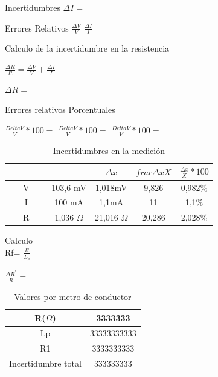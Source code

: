 \documentclass[12pt, letterpaper]{article}
\begin{document}
\item  Incertidumbres\singlespacing
$\Delta I=$\singlespacing
\item Errores Relativos\singlespacing
$\frac{\Delta V}{V}$\singlespacing
$\frac{\Delta I}{I}$ \singlespacing
\item Calculo de la incertidumbre en la resistencia\singlespacing

$\frac{\Delta R}{R} =\frac{\Delta V}{V} + \frac{\Delta I}{I}$ \singlespacing

$\Delta R=$\singlespacing

\item Errores relativos Porcentuales\singlespacing

$\frac{Delta V}{V} * 100=$\singlespacing
$\frac{Delta V}{V} * 100=$\singlespacing
$\frac{Delta V}{V} * 100=$\singlespacing
 
\begin{table}[H]
\centering
\caption{Incertidumbres en la medición}
	\begin{tabular}{|c|c|c|c|c|}
    	\hline
    	----------- & ----------- & $\Delta x$  & $frac{\Delta x}{X}$  & $\frac{\Delta x}{X} *100$ \\ \hline
    	V           & 103,6 mV    & 1,018mV & 9,826      & 0,982\%        \\ \hline
    	I           & 100 mA      & 1,1mA   & 11         & 1,1\%          \\ \hline
    	R           & 1,036    $\Omega$    & 21,016 $\Omega$  & 20,286     & 2,028\%        \\ \hline
	\end{tabular}
 \label{tab\insertidumbres}
\end{table}

\singlespacing
\item Calculo\\ 

Rf= $\frac{R}{L_{p}}$
\singlespacing

$\frac{ \Delta R^'}{R} =$ 
\singlespacing

\begin{table}[H]
\centering
\caption{Valores por metro de conductor}
    \begin{tabular}{|c|c|}\hline
        R($\Omega$)                 & 3333333     \\ \hline
        Lp                  & 33333333333 \\ \hline
        R1                  & 3333333333  \\ \hline
        Incertidumbre total & 333333333   \\ \hline
    \end{tabular}
    \label{tab:val_x_metro}
\end{table}
\end{document}
